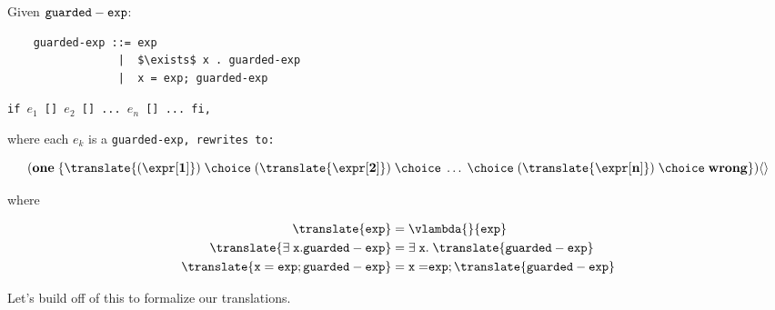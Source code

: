 \documentclass[]{article}
\begin{document}
Given $\tt{guarded-exp}$:

\begin{lstlisting}
    guarded-exp ::= exp
                 |  $\exists$ x . guarded-exp
                 |  x = exp; guarded-exp

\end{lstlisting}

\tt{if $e_1$ [] $e_2$ [] ... $e_n$ [] ... fi},

where each $e_k$ is a \tt{guarded-exp}, rewrites to: 

$$
(\bf{one} \; \{\translate{(\expr[1]})
\; \choice \; (\translate{\expr[2]}) 
\; \choice \; \dots \; \choice \; 
(\translate{\expr[n]}) 
\; \choice \; \bf{wrong} \})
 \langle\rangle  \\
$$  

where

\begin{align}    
    \translate{\tt{exp}} &= \vlambda{}{\tt{exp}} \\
    \translate{\exists \; \tt{x.guarded-exp}} 
    &= \exists \; \tt{x.} \; \translate{\tt{guarded-exp}} \\
    \translate{\tt{x = exp; guarded-exp}} 
    &= \tt{x = } \tt{exp}; \translate{\tt{guarded-exp}}
\end{align}

Let's build off of this to formalize our translations. 
\end{document}

